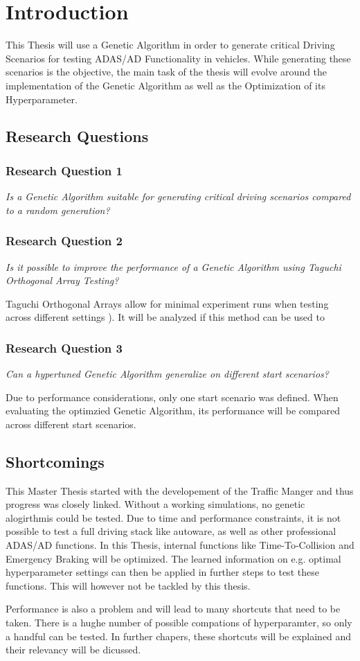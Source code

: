 \chapter{Introduction}


This Thesis will use a Genetic Algorithm in order to generate critical Driving Scenarios for testing ADAS/AD Functionality in vehicles.
While generating these scenarios is the objective, the main task of the thesis will evolve around the implementation of the Genetic Algorithm as well as the Optimization of its Hyperparameter.


\section{Research Questions}
\subsection{Research Question 1}
\textit{Is a Genetic Algorithm suitable for generating critical driving scenarios compared to a random generation?}

\subsection{Research Question 2}
\textit{Is it possible to improve the performance of a Genetic Algorithm using Taguchi Orthogonal Array Testing?}

Taguchi Orthogonal Arrays allow for minimal experiment runs when testing across different settings \cite{roy_primer_1990}). It will be analyzed if this method can be used to 

\subsection{Research Question 3}
\textit{Can a hypertuned Genetic Algorithm generalize on different start scenarios?}

Due to performance considerations, only one start scenario was defined. When evaluating the optimzied Genetic Algorithm, its performance will be compared across different start scenarios.


\section{Shortcomings}
This Master Thesis started with the developement of the Traffic Manger and thus progress was closely linked. Without a working simulations, no genetic alogirthmis could be tested. Due to time and performance constraints, it is not possible to test a full driving stack like autoware, as well as other professional ADAS/AD functions.
In this Thesis, internal functions like Time-To-Collision and Emergency Braking will be optimized. The learned  information on e.g. optimal hyperparameter settings can then be applied in further steps to test these functions. This will however not be tackled by this thesis.

Performance is also a problem and will lead to many shortcuts that need to be taken. There is a hughe number of possible compations of hyperparamter, so only a handful can be tested. In further chapers, these shortcuts will be explained and their relevancy will be dicussed.
